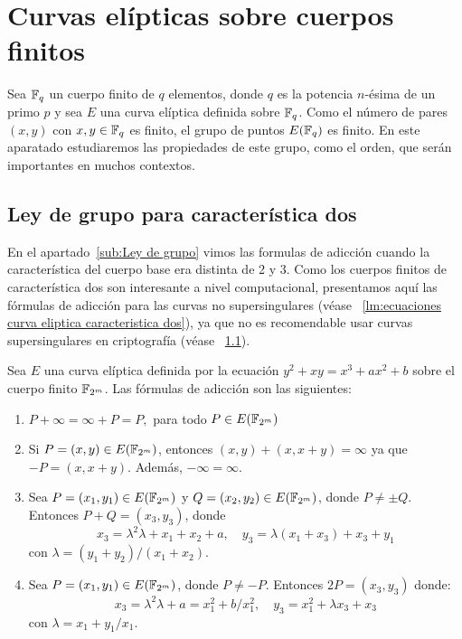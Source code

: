 \clearpage

\section{Curvas elípticas sobre cuerpos finitos}
\label{sec:Curvas elípticas sobre cuerpos finitos}

Sea $\mathbb{F}_q$ un cuerpo finito de $q$ elementos, donde $q$ es la potencia $n$-ésima de un primo $p$ y sea $E$ una curva elíptica definida sobre $\mathbb{F}_q$. Como el número de pares $(x, y)$ con $x, y \in \mathbb{F}_q$ es finito, el grupo de puntos $E(\mathbb{F}_q)$ es finito. En este aparatado estudiaremos las propiedades de este grupo, como el orden, que serán importantes en muchos contextos.


\subsection{Ley de grupo para característica dos}

En el apartado~\ref{sub:Ley de grupo} vimos las formulas de adicción cuando la característica del cuerpo base era distinta de 2 y 3. Como los cuerpos finitos de característica dos son interesante a nivel computacional, presentamos aquí las fórmulas de adicción para las curvas no supersingulares (véase ~\ref{lm:ecuaciones curva eliptica caracteristica dos}), ya que no es recomendable usar curvas supersingulares en criptografía (véase ~\ref{}).

\begin{formulasadiccion}
Sea $E$ una curva elíptica definida por la ecuación $y^2 + x y = x^3 + a x^2 + b$ sobre el cuerpo finito $\mathbb{F}_{2^m}$. Las fórmulas de adicción son las siguientes:
	\begin{enumerate}[label=\alph*)]
	   \item $P + \infty = \infty + P = P,$ para todo $P \in E(\mathbb{F}_{2^m})$
	   \item Si $P = (x, y) \in E(\mathbb{F}_{2^m})$, entonces $(x, y) + (x, x + y) = \infty$ ya que $-P = (x, x + y)$. Además, $- \infty = \infty$.
	   \item Sea $P = (x_1, y_1) \in E(\mathbb{F}_{2^m})$ y $Q = (x_2, y_2) \in E(\mathbb{F}_{2^m})$, donde $P \neq \pm Q$. Entonces $P + Q = (x_3, y_3)$, donde
	   $$
	   x_3 = \lambda^2 \lambda + x_1 + x_2 + a, \quad
	   y_3 = \lambda (x_1 + x_3) + x_3 + y_1
	   $$
	   con $\lambda = (y_1 + y_2)/(x_1 + x_2)$.
	   \item Sea $P = (x_1, y_1) \in E(\mathbb{F}_{2^m})$, donde $P \neq -P$. Entonces $2 P = (x_3, y_3)$ donde:
	   $$
	   x_3 = \lambda^2 \lambda + a = x_1^2 + b/x_1^2, \quad
	   y_3 = x_1^2 + \lambda x_3 + x_3
	   $$
	   con $\lambda = x_1 + y_1/x_1$.
	\end{enumerate}
\end{formulasadiccion}

